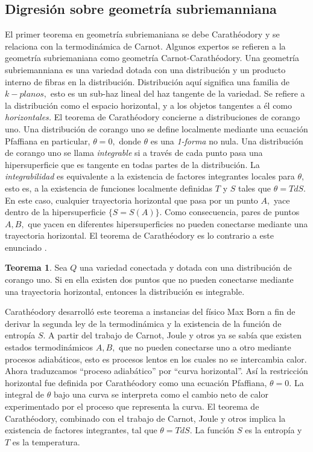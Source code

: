 \documentclass{article}
\theoremstyle{definition} \newtheorem{defi}{Definici\'on}
\theoremstyle{definition} \newtheorem{teo}{Teorema}
\theoremstyle{definition} \newtheorem{cor}{Corolario}
\begin{document}
\subsection{Digresi\'on sobre geometr\'ia subriemanniana}
El primer teorema en geometr\'ia subriemaniana se debe Carath\'eodory y se relaciona con la termodin\'amica de Carnot. Algunos expertos se refieren a la geometr\'ia subriemaniana como geometr\'ia Carnot-Carath\'eodory. Una geometr\'ia subriemanniana es una variedad dotada con una distribuci\'on y un producto interno de fibras en la distribuci\'on. Distribuci\'on aqu\'i significa una familia de $k-planos,$ esto es un sub-haz lineal del haz tangente de la variedad. Se refiere a la distribuci\'on como el espacio horizontal, y a los objetos tangentes a \'el como \emph{horizontales.} El teorema de Carath\'eodory concierne a distribuciones de corango uno. Una distribuci\'on de corango uno se define localmente mediante una ecuaci\'on Pfaffiana en particular, $\theta=0,$ donde $\theta$ es una \emph{1-forma} no nula. Una distribuci\'on de corango uno se llama \emph{integrable} si a trav\'es de cada punto pasa una hipersuperficie que es tangente en todas partes de la distribuci\'on. La \emph{integrabilidad} es equivalente a la existencia de factores integrantes locales para $\theta,$ esto es, a la existencia de funciones localmente definidas $T$ y $S$ tales que $\theta=TdS.$ En este caso, cualquier trayectoria horizontal que pasa por un punto $A,$ yace dentro de la hipersuperficie $\{S=S(A)\}.$ Como consecuencia, pares de puntos $A, B,$ que yacen en diferentes hipersuperficies no pueden conectarse mediante una trayectoria horizontal. El teorema de Carath\'eodory es lo contrario a este enunciado \cite{RM}.
\begin{teo}
Sea $Q$ una variedad conectada y dotada con una distribuci\'on de corango uno. Si en ella existen dos puntos que no pueden conectarse mediante una trayectoria horizontal, entonces la distribuci\'on es integrable.
\end{teo}
Carath\'eodory desarroll\'o este teorema a instancias del f\'isico Max Born a fin de derivar la segunda ley de la termodin\'amica y la existencia de la funci\'on de entrop\'ia $S.$ A partir del trabajo de Carnot, Joule y otros ya se sab\'ia que existen estados termodin\'amicos $A, B,$ que no pueden conectarse uno a otro mediante procesos adiab\'aticos, esto es procesos lentos en los cuales no se intercambia calor. Ahora traduzcamos ``proceso adiab\'atico'' por ``curva horizontal''. As\'i la restricci\'on horizontal fue definida por Carath\'eodory como una ecuaci\'on Pfaffiana, $\theta=0.$ La integral de $\theta$ bajo una curva se interpreta como el cambio neto de calor experimentado por el proceso que representa la curva. El teorema de Carath\'eodory, combinado con el trabajo de Carnot, Joule y otros implica la existencia de factores integrantes, tal que $\theta=TdS.$ La funci\'on $S$ es la entrop\'ia y $T$ es la temperatura.
\end{document}

